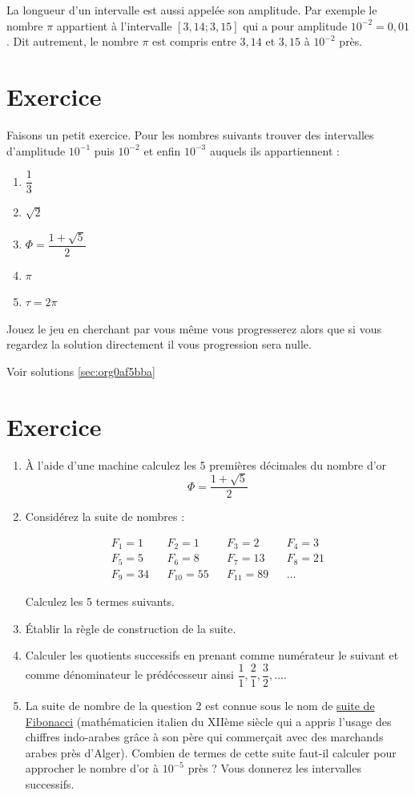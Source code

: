 \documentclass[a4paper, 11pt, twoside]{book}
\begin{document}
La longueur d'un intervalle est aussi appelée son amplitude. Par
exemple le nombre \(\pi\) appartient à l'intervalle \([3,14 ; 3,15]\)
qui a pour amplitude \(10^{-2} = 0,01\). Dit autrement, le nombre
\(\pi\) est compris entre \(3,14\) et \(3,15\) à \(10^{-2}\) près.

\section{Exercice}
\label{sec:org3ebd799}
Faisons un petit exercice. Pour les nombres suivants trouver des
intervalles d'amplitude \(10^{-1}\) puis \(10^{-2}\) et enfin \(10^{-3}\)
auquels ils appartiennent :
\begin{enumerate}
\item \(\dfrac{1}{3}\)
\item \(\sqrt{2}\)
\item \(\Phi = \dfrac{1 + \sqrt{5}}{2}\)
\item \(\pi\)
\item \(\tau = 2\pi\)
\end{enumerate}

Jouez le jeu en cherchant par vous même vous progresserez alors que
si vous regardez la solution directement il vous progression sera
nulle.

Voir solutions \ref{sec:org0af5bba}

\section{Exercice}
\label{sec:orgddaeb73}
\begin{enumerate}
\item À l'aide d'une machine calculez les 5 premières décimales du nombre d'or
\[\Phi = \dfrac{1 + \sqrt{5}}{2}\]
\item Considérez la suite de nombres :

\begin{align*}
 F_1 = 1&& F_2 = 1&& F_3 = 2&& F_4 = 3\\
 F_5 = 5&& F_6 = 8&& F_7 = 13&& F_8 = 21\\
 F_9 = 34&& F_{10} = 55&& F_{11} = 89&&\dots
\end{align*}

Calculez les 5 termes suivants.
\item Établir la règle de construction de la suite.
\item Calculer les quotients successifs en prenant comme numérateur le
suivant et comme dénominateur le prédécesseur ainsi
\(\dfrac{1}{1}, \dfrac{2}{1}, \dfrac{3}{2},\dots\).
\item La suite de nombre de la question 2 est connue sous le nom de
\href{https://fr.wikipedia.org/wiki/Suite\_de\_Fibonacci}{suite de Fibonacci} (mathématicien italien du XIIème siècle qui a
appris l'usage des chiffres indo-arabes grâce à son père qui
commerçait avec des marchands arabes près d'Alger). Combien de
termes de cette suite faut-il calculer pour approcher le nombre
d'or à \(10^{-5}\) près ? Vous donnerez les intervalles successifs.
\end{enumerate}
\end{document}
